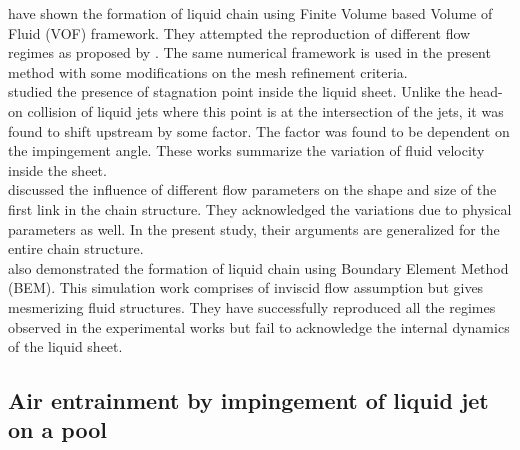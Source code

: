 \citet{chen2013high} have shown the formation of liquid chain using Finite Volume based Volume of Fluid (VOF) framework. They attempted the reproduction of different flow regimes as proposed by \citet{bush2004collision}. The same numerical framework is used in the present method with some modifications on the mesh refinement criteria.\\
\citet{inamura2014effect} studied the presence of stagnation point inside the liquid sheet. Unlike the head-on collision of liquid jets where this point is at the intersection of the jets, it was found to shift upstream by some factor. The factor was found to be dependent on the impingement angle. These works summarize the variation of fluid velocity inside the sheet.\\
\citet{yang2014liquid} discussed the influence of different flow parameters on the shape and size of the first link in the chain structure. They acknowledged the variations due to physical parameters as well. In the present study, their arguments are generalized for the entire chain structure.\\
\citet{da2016surface} also demonstrated the formation of liquid chain using Boundary Element Method (BEM). This simulation work comprises of inviscid flow assumption but gives mesmerizing fluid structures. They have successfully reproduced all the regimes observed in the experimental works but fail to acknowledge the internal dynamics of the liquid sheet.
\subsection{Air entrainment by impingement of liquid jet on a pool}
